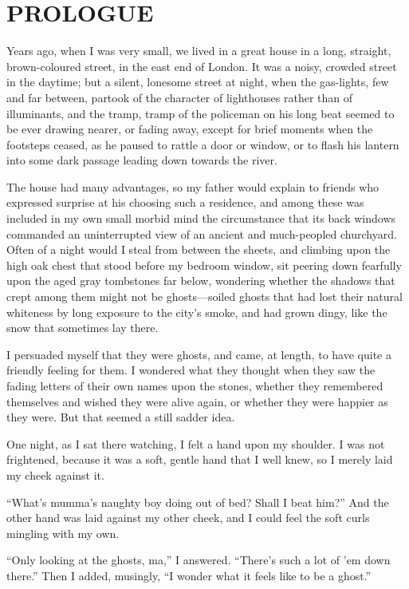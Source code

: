\documentclass[a4paper, 12pt]{memoir}
\begin{document}
\frontmatter
\mainmatter

\chapter*{PROLOGUE}
\thispagestyle{plain}
Years ago, when I was very small, we lived in a great house in a long, straight, brown-coloured street, in the east end of London.  It was a noisy, crowded street in the daytime; but a silent, lonesome street at night, when the gas-lights, few and far between, partook of the character of lighthouses rather than of illuminants, and the tramp, tramp of the policeman on his long beat seemed to be ever drawing nearer, or fading away, except for brief moments when the footsteps ceased, as he paused to rattle a door or window, or to flash his lantern into some dark passage leading down towards the river.

The house had many advantages, so my father would explain to friends who expressed surprise at his choosing such a residence, and among these was included in my own small morbid mind the circumstance that its back windows commanded an uninterrupted view of an ancient and much-peopled churchyard.  Often of a night would I steal from between the sheets, and climbing upon the high oak chest that stood before my bedroom window, sit peering down fearfully upon the aged gray tombstones far below, wondering whether the shadows that crept among them might not be ghosts---soiled ghosts that had lost their natural whiteness by long exposure to the city’s smoke, and had grown dingy, like the snow that sometimes lay there.

I persuaded myself that they were ghosts, and came, at length, to have quite a friendly feeling for them.  I wondered what they thought when they saw the fading letters of their own names upon the stones, whether they remembered themselves and wished they were alive again, or whether they were happier as they were.  But that seemed a still sadder idea.

One night, as I sat there watching, I felt a hand upon my shoulder.  I was not frightened, because it was a soft, gentle hand that I well knew, so I merely laid my cheek against it.

``What's mumma's naughty boy doing out of bed? Shall I beat him?''  And the other hand was laid against my other cheek, and I could feel the soft curls mingling with my own.

``Only looking at the ghosts, ma,'' I answered. ``There's such a lot of 'em down there.''  Then I added, musingly, ``I wonder what it feels like to be a ghost.''
\end{document}
